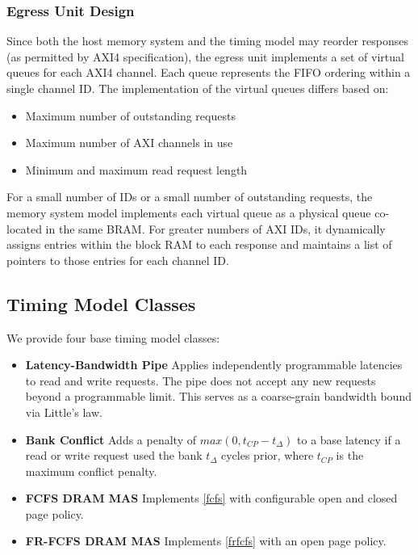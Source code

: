 \subsubsection{Egress Unit Design}\label{egress}
Since both the host memory system and the timing model may reorder responses
(as permitted by AXI4 specification), the egress unit implements a set of
virtual queues for each AXI4 channel. Each queue represents the FIFO ordering
within a single channel ID. The implementation of the virtual queues differs
based on:

\begin{itemize}
    \item Maximum number of outstanding requests
    \item Maximum number of AXI channels in use
    \item Minimum and maximum read request length
\end{itemize}

For a small number of IDs or a small number of outstanding requests, the
memory system model implements each virtual queue as a physical queue co-located in
the same BRAM. For greater numbers of AXI IDs, it dynamically assigns entries
within the block RAM to each response and maintains a list of pointers to those
entries for each channel ID.

\subsection{Timing Model Classes}
\label{sec:timing_model}

We provide four base timing model classes:

\begin{itemize}
    \item \textbf{Latency-Bandwidth Pipe} Applies independently programmable
    latencies to read and write requests. The pipe does not accept any new requests beyond
    a programmable limit. This serves as a coarse-grain bandwidth bound via
    Little's law.

    \item \textbf{Bank Conflict} Adds a penalty of $max(0, t_{CP} -
    t_{\Delta})$ to a base latency if a read or write request used the bank
    $t_{\Delta}$ cycles prior, where $t_{CP}$ is the maximum conflict penalty.

    \item \textbf{FCFS DRAM MAS} Implements \ref{fcfs} with configurable open and closed page policy.
    \item \textbf{FR-FCFS DRAM MAS} Implements \ref{frfcfs} with an open page policy.
\end{itemize}


